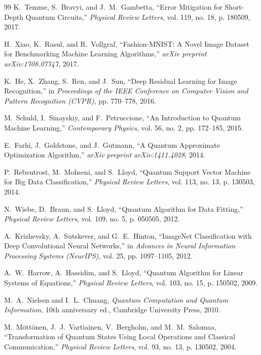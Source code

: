\documentclass[journal]{IEEEtran}
\begin{document}
\begin{thebibliography}{99}
K.~Temme, S.~Bravyi, and J.~M.~Gambetta,
``Error Mitigation for Short-Depth Quantum Circuits,''
\emph{Physical Review Letters}, vol. 119, no. 18,
p. 180509, 2017.

H.~Xiao, K.~Rasul, and R.~Vollgraf,
``Fashion-MNIST: A Novel Image Dataset for Benchmarking Machine Learning Algorithms,''
\emph{arXiv preprint arXiv:1708.07747}, 2017.

K.~He, X.~Zhang, S.~Ren, and J.~Sun,
``Deep Residual Learning for Image Recognition,''
in \emph{Proceedings of the IEEE Conference on Computer Vision and Pattern Recognition (CVPR)},
pp. 770--778, 2016.

M.~Schuld, I.~Sinayskiy, and F.~Petruccione,
``An Introduction to Quantum Machine Learning,''
\emph{Contemporary Physics}, vol. 56, no. 2,
pp. 172--185, 2015.

E.~Farhi, J.~Goldstone, and J.~Gutmann,
``A Quantum Approximate Optimization Algorithm,''
\emph{arXiv preprint arXiv:1411.4028}, 2014.

P.~Rebentrost, M.~Mohseni, and S.~Lloyd,
``Quantum Support Vector Machine for Big Data Classification,''
\emph{Physical Review Letters}, vol. 113, no. 13,
p. 130503, 2014.

N.~Wiebe, D.~Braun, and S.~Lloyd,
``Quantum Algorithm for Data Fitting,''
\emph{Physical Review Letters}, vol. 109, no. 5,
p. 050505, 2012.

A.~Krizhevsky, A.~Sutskever, and G.~E.~Hinton,
``ImageNet Classification with Deep Convolutional Neural Networks,''
in \emph{Advances in Neural Information Processing Systems (NeurIPS)},
vol. 25, pp. 1097--1105, 2012.

A.~W.~Harrow, A.~Hassidim, and S.~Lloyd,
``Quantum Algorithm for Linear Systems of Equations,''
\emph{Physical Review Letters}, vol. 103, no. 15,
p. 150502, 2009.

M.~A.~Nielsen and I.~L.~Chuang,
\emph{Quantum Computation and Quantum Information},
10th anniversary ed., Cambridge University Press, 2010.

M.~M{\"o}tt{\"o}nen, J.~J.~Vartiainen, V.~Bergholm,
and M.~M.~Salomaa,
``Transformation of Quantum States Using Local Operations and Classical Communication,''
\emph{Physical Review Letters}, vol. 93, no. 13,
p. 130502, 2004.


\end{thebibliography}
\end{document}
